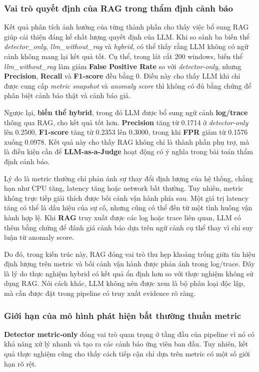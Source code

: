 \subsubsection{Vai trò quyết định của RAG trong thẩm định cảnh báo}
Kết quả phân tích ảnh hưởng của từng thành phần cho thấy việc bổ sung RAG giúp cải thiện đáng kể chất lượng quyết định của LLM. Khi so sánh ba biến thể \textit{detector\_only}, \textit{llm\_without\_rag} và \textit{hybrid}, có thể thấy rằng LLM không có ngữ cảnh không mang lại kết quả tốt. Cụ thể, trong lát cắt 200 windows, biến thể \textit{llm\_without\_rag} làm giảm \textbf{False Positive Rate} so với\textit{ detector-only}, nhưng \textbf{Precision}, \textbf{Recall} và \textbf{F1-score} đều bằng 0. Điều này cho thấy LLM khi chỉ được cung cấp \textit{metric snapshot} và \textit{anomaly score} thì không có đủ bằng chứng để phân biệt cảnh báo thật và cảnh báo giả.

Ngược lại, \textbf{biến thể hybrid}, trong đó LLM được bổ sung ngữ cảnh \textbf{log/trace} thông qua RAG, cho kết quả tốt hơn. \textbf{Precision} tăng từ 0.1714 ở \textit{detector-only} lên 0.2500, \textbf{F1-score} tăng từ 0.2353 lên 0.3000, trong khi \textbf{FPR} giảm từ 0.1576 xuống 0.0978. Kết quả này cho thấy RAG không chỉ là thành phần phụ trợ, mà là điều kiện cần để \textbf{LLM-as-a-Judge} hoạt động có ý nghĩa trong bài toán thẩm định cảnh báo.

Lý do là metric thường chỉ phản ánh sự thay đổi định lượng của hệ thống, chẳng hạn như CPU tăng, latency tăng hoặc network bất thường. Tuy nhiên, metric không trực tiếp giải thích được bối cảnh vận hành phía sau. Một giá trị latency tăng có thể là dấu hiệu của sự cố, nhưng cũng có thể đến từ một tình huống vận hành hợp lệ. Khi \textbf{RAG} truy xuất được các log hoặc trace liên quan, LLM có thêm bằng chứng để đánh giá cảnh báo dựa trên ngữ cảnh cụ thể thay vì chỉ suy luận từ anomaly score.

Do đó, trong kiến trúc này, RAG đóng vai trò thu hẹp khoảng trống giữa tín hiệu định lượng trên metric và bối cảnh vận hành được phản ánh trong log/trace. Đây là lý do thực nghiệm hybrid có kết quả ổn định hơn so với thực nghiệm không sử dụng RAG. Nói cách khác, LLM không nên được xem là bộ phân loại độc lập, mà cần được đặt trong pipeline có truy xuất evidence rõ ràng.
\subsubsection{Giới hạn của mô hình phát hiện bất thường thuần metric}
\textbf{Detector metric-only} đóng vai trò quan trọng ở tầng đầu của pipeline vì nó có khả năng xử lý nhanh và tạo ra các cảnh báo ứng viên ban đầu. Tuy nhiên, kết quả thực nghiệm cũng cho thấy cách tiếp cận chỉ dựa trên metric có một số giới hạn rõ rệt.

